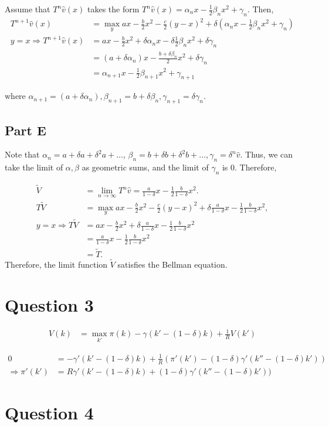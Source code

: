 \documentclass[11pt]{article} %
\begin{document}
Assume that $T^n\hat{v}(x)$ takes the form $T^n\hat{v}(x) = \alpha_n x - \frac{1}{2}\beta_n x^2 + \gamma_n.$ Then,
\begin{align*}
T^{n+1}\hat{v} (x) &= \max_y ax - \frac{b}{2}x^2 - \frac{c}{2}(y-x)^2 + \delta (\alpha_n x - \frac{1}{2}\beta_n x^2 + \gamma_n)\\
y=x \Rightarrow T^{n+1}\hat{v} (x) &= ax - \frac{b}{2}x^2 + \delta \alpha_n x - \delta \frac{1}{2}\beta_n x^2 + \delta \gamma_n\\
&= (a+\delta \alpha_n) x - \frac{b + \delta \beta_n}{2}x^2 +\delta \gamma_n\\
&= \alpha_{n+1} x - \frac{1}{2}\beta_{n+1} x^2 + \gamma_{n+1}
\end{align*}

where $\alpha_{n+1} =  (a+\delta \alpha_n) , \beta_{n+1} = b + \delta \beta_n ,  \gamma_{n+1} = \delta \gamma_n $.

\subsection{Part E}
Note that $\alpha_{n} = a + \delta a + \delta^2 a + \dots$, $\beta_n = b + \delta b + \delta^2 b + \dots, \gamma_n = \delta^n\hat{v}$. Thus, we can take the limit of $\alpha,\beta$ as geometric sums, and the limit of $\gamma_n$ is $0$. Therefore,

\begin{align*}
\tilde{V} &= \lim_{n\rightarrow \infty} T^n \hat{v} = \frac{a}{1-\delta}x - \frac{1}{2}\frac{b}{1-\delta}x^2.\\
T\tilde{V} &= \max_{y} ax - \frac{b}{2}x^2 - \frac{c}{2}(y-x)^2 + \delta \frac{a}{1-\delta}x - \frac{1}{2}\frac{b}{1-\delta}x^2,\\
y=x\Rightarrow T\tilde{V} &=  ax - \frac{b}{2}x^2 + \delta \frac{a}{1-\delta}x - \frac{1}{2}\frac{b}{1-\delta}x^2\\
&= \frac{a}{1-\delta}x - \frac{1}{2}\frac{b}{1-\delta}x^2\\
&= \tilde{T}.
\end{align*}
Therefore, the limit function $\tilde{V}$ satisfies the Bellman equation.
\section{Question 3}
\begin{align*}
V(k) &= \max_{k'} \pi (k) - \gamma(k' - (1-\delta)k) + \frac{1}{R}V(k')
\end{align*}

\begin{align*}
0&= -\gamma' (k' - (1-\delta)k) + \frac{1}{R}\left( \pi'(k') - (1-\delta) \gamma'(k'' - (1-\delta)k') \right)\\
\Rightarrow \pi '(k') &= R \gamma '(k' - (1-\delta)k) + (1-\delta) \gamma'(k'' - (1-\delta)k'))
\end{align*}
\section{Question 4}
\end{document}
